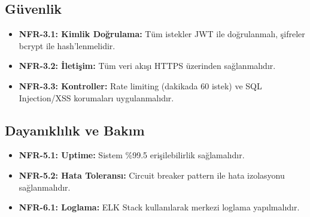 \subsection{Güvenlik}
\begin{itemize}
    \item \textbf{NFR-3.1: Kimlik Doğrulama:} Tüm istekler JWT ile doğrulanmalı, şifreler bcrypt ile hash'lenmelidir.
    \item \textbf{NFR-3.2: İletişim:} Tüm veri akışı HTTPS üzerinden sağlanmalıdır.
    \item \textbf{NFR-3.3: Kontroller:} Rate limiting (dakikada 60 istek) ve SQL Injection/XSS korumaları uygulanmalıdır.
\end{itemize}

\subsection{Dayanıklılık ve Bakım}
\begin{itemize}
    \item \textbf{NFR-5.1: Uptime:} Sistem \%99.5 erişilebilirlik sağlamalıdır.
    \item \textbf{NFR-5.2: Hata Toleransı:} Circuit breaker pattern ile hata izolasyonu sağlanmalıdır.
    \item \textbf{NFR-6.1: Loglama:} ELK Stack kullanılarak merkezi loglama yapılmalıdır.
\end{itemize}
